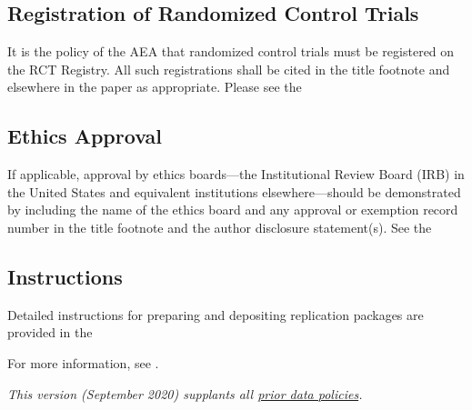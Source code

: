 \subsection{Registration of Randomized Control
Trials}\label{registration-of-randomized-control-trials}

It is the policy of the AEA that randomized control trials must be
registered on the RCT Registry. All such registrations shall be cited in
the title footnote and elsewhere in the paper as appropriate. Please see
the 

\subsection{Ethics Approval}\label{ethics-approval}

If applicable, approval by ethics boards---the Institutional Review
Board (IRB) in the United States and equivalent institutions
elsewhere---should be demonstrated by including the name of the ethics
board and any approval or exemption record number in the title footnote
and the author disclosure statement(s). See the

\subsection{Instructions}\label{instructions}

Detailed instructions for preparing and depositing replication packages
are provided in the

For more information, see
.


\emph{This version (September 2020) supplants all
\href{https://www.aeaweb.org/journals/data/archive}{prior data
policies}.}

~
